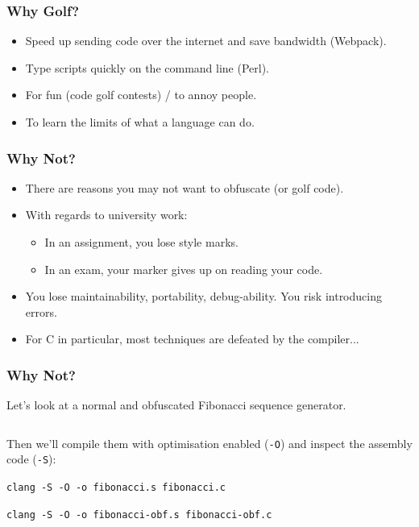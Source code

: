 \documentclass[handout,xcolor]{beamer}
\begin{document}
\begin{frame}
	\frametitle{Why Golf?}
	\pause
	
	\begin{itemize}
		\item Speed up sending code over the internet and save bandwidth (Webpack).
		\pause
		\item Type scripts quickly on the command line (Perl).
		\pause
		\item For fun (code golf contests) / to annoy people.
		\pause
		\item To learn the limits of what a language can do.
	\end{itemize}
\end{frame}

\begin{frame}
	\frametitle{Why Not?}
	\pause
	
	\begin{itemize}
		\item There are reasons you may not want to obfuscate (or golf code).
		\pause
		\item With regards to university work:
		\pause
		\begin{itemize}
			\item In an assignment, you lose style marks.
			\pause
			\item In an exam, your marker gives up on reading your code.
		\end{itemize}
		\pause
		\item You lose maintainability, portability, debug-ability. You risk introducing errors.
		\pause
		\item For C in particular, most techniques are defeated by the compiler...
	\end{itemize}
\end{frame}

\begin{frame}
	\frametitle{Why Not?}
	\pause
	
	Let's look at a normal and obfuscated Fibonacci sequence generator.
	\pause
	
	\begin{columns}
		\begin{column}{0.45\textwidth}
			\centering
			
		\end{column}
		\pause
		\begin{column}{0.45\textwidth}
			\centering
			
		\end{column}
	\end{columns}
	\pause
	
	Then we'll compile them with optimisation enabled (\texttt{-O}) and inspect the assembly code (\texttt{-S}):
	\pause
	
	\texttt{clang -S -O -o fibonacci.s fibonacci.c}
	
	\texttt{clang -S -O -o fibonacci-obf.s fibonacci-obf.c}
\end{frame}
\end{document}
